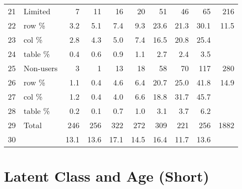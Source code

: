 \documentclass{article}
\begin{document}
\begin{table}[ht]
\begin{tabular}{llrrrrrrrr}
  21 & Limited & 7 & 11 & 16 & 20 & 51 & 46 & 65 & 216 \\ 
  22 & row \% & 3.2 & 5.1 & 7.4 & 9.3 & 23.6 & 21.3 & 30.1 & 11.5 \\ 
  23 & col \% & 2.8 & 4.3 & 5.0 & 7.4 & 16.5 & 20.8 & 25.4 &  \\ 
  24 & table \% & 0.4 & 0.6 & 0.9 & 1.1 & 2.7 & 2.4 & 3.5 &  \\ 
  25 & Non-users & 3 & 1 & 13 & 18 & 58 & 70 & 117 & 280 \\ 
  26 & row \% & 1.1 & 0.4 & 4.6 & 6.4 & 20.7 & 25.0 & 41.8 & 14.9 \\ 
  27 & col \% & 1.2 & 0.4 & 4.0 & 6.6 & 18.8 & 31.7 & 45.7 &  \\ 
  28 & table \% & 0.2 & 0.1 & 0.7 & 1.0 & 3.1 & 3.7 & 6.2 &  \\ 
  29 & Total & 246 & 256 & 322 & 272 & 309 & 221 & 256 & 1882 \\ 
  30 &  & 13.1 & 13.6 & 17.1 & 14.5 & 16.4 & 11.7 & 13.6 &  \\ 
   \hline
\end{tabular}
\end{table}

\section{Latent Class and Age (Short)}
\end{document}
